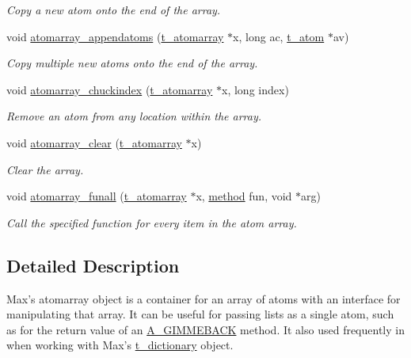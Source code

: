 \begin{DoxyCompactItemize}
\begin{DoxyCompactList}\small\item\em Copy a new atom onto the end of the array. \item\end{DoxyCompactList}\item 
void \hyperlink{group__atomarray_gae604fed9f8ca266b1b0d080e8cc929c3}{atomarray\_\-appendatoms} (\hyperlink{structt__atomarray}{t\_\-atomarray} $\ast$x, long ac, \hyperlink{structt__atom}{t\_\-atom} $\ast$av)
\begin{DoxyCompactList}\small\item\em Copy multiple new atoms onto the end of the array. \item\end{DoxyCompactList}\item 
void \hyperlink{group__atomarray_gaf76d3ab0de8a7b6b0b0e32193608c2dd}{atomarray\_\-chuckindex} (\hyperlink{structt__atomarray}{t\_\-atomarray} $\ast$x, long index)
\begin{DoxyCompactList}\small\item\em Remove an atom from any location within the array. \item\end{DoxyCompactList}\item 
void \hyperlink{group__atomarray_ga185b275ee3d94fa9a21d3ca6ece43c33}{atomarray\_\-clear} (\hyperlink{structt__atomarray}{t\_\-atomarray} $\ast$x)
\begin{DoxyCompactList}\small\item\em Clear the array. \item\end{DoxyCompactList}\item 
void \hyperlink{group__atomarray_gacfb767a18f14fb13a0952c6ed7903de1}{atomarray\_\-funall} (\hyperlink{structt__atomarray}{t\_\-atomarray} $\ast$x, \hyperlink{group__datatypes_gac26ba0a173b50597f5738132e059b42d}{method} fun, void $\ast$arg)
\begin{DoxyCompactList}\small\item\em Call the specified function for every item in the atom array. \item\end{DoxyCompactList}\end{DoxyCompactItemize}


\subsection{Detailed Description}
Max's atomarray object is a container for an array of atoms with an interface for manipulating that array. It can be useful for passing lists as a single atom, such as for the return value of an \hyperlink{group__atom_gga8aa6700e9f00b132eb376db6e39ade47ad150bf3de9c8dc2ddfa0ca0ca2382360}{A\_\-GIMMEBACK} method. It also used frequently in when working with Max's \hyperlink{structt__dictionary}{t\_\-dictionary} object.

